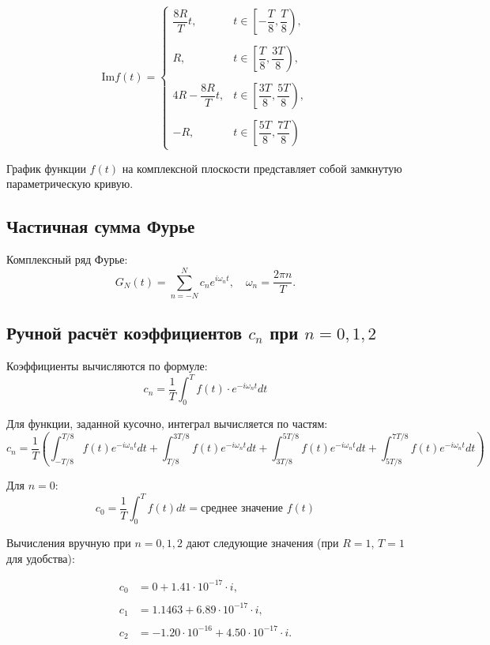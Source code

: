 \[
\text{Im} f(t) =
\begin{cases}
\dfrac{8R}{T} t, & t \in \left[ -\dfrac{T}{8}, \dfrac{T}{8} \right), \\\\
R, & t \in \left[ \dfrac{T}{8}, \dfrac{3T}{8} \right), \\\\
4R - \dfrac{8R}{T} t, & t \in \left[ \dfrac{3T}{8}, \dfrac{5T}{8} \right), \\\\
- R, & t \in \left[ \dfrac{5T}{8}, \dfrac{7T}{8} \right)
\end{cases}
\]

График функции $f(t)$ на комплексной плоскости представляет собой замкнутую параметрическую кривую.

\subsection*{Частичная сумма Фурье}

Комплексный ряд Фурье:
\[
G_N(t) = \sum_{n=-N}^{N} c_n e^{i \omega_n t}, \quad \omega_n = \frac{2\pi n}{T}.
\]

\subsection*{Ручной расчёт коэффициентов $c_n$ при $n = 0, 1, 2$}

Коэффициенты вычисляются по формуле:
\[
c_n = \frac{1}{T} \int_{0}^{T} f(t) \cdot e^{-i \omega_n t} dt
\]

Для функции, заданной кусочно, интеграл вычисляется по частям:
\[
c_n = \frac{1}{T} \left(
\int_{-T/8}^{T/8} f(t) e^{-i\omega_n t} dt +
\int_{T/8}^{3T/8} f(t) e^{-i\omega_n t} dt +
\int_{3T/8}^{5T/8} f(t) e^{-i\omega_n t} dt +
\int_{5T/8}^{7T/8} f(t) e^{-i\omega_n t} dt
\right)
\]

Для $n = 0$:
\[
c_0 = \frac{1}{T} \int_{0}^{T} f(t) dt = \text{среднее значение } f(t)
\]

Вычисления вручную при $n = 0, 1, 2$ дают следующие значения (при $R = 1$, $T = 1$ для удобства):

\begin{align*}
    c_0 &= 0 + 1.41 \cdot 10^{-17} \cdot i, \\\\
    c_1 &= 1.1463 + 6.89 \cdot 10^{-17} \cdot i, \\\\
    c_2 &= -1.20 \cdot 10^{-16} + 4.50 \cdot 10^{-17} \cdot i.
\end{align*}

